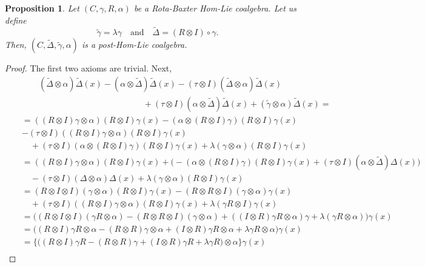 \documentclass{article}
\newtheorem{prop}[thm]{Proposition}
\theoremstyle{definition}
\theoremstyle{remark}
\numberwithin{equation}{section}
\begin{document}
\begin{prop}
 Let $(C, \gamma, R, \alpha)$ be a Rota-Baxter Hom-Lie coalgebra. Let us define
$$\tilde\gamma=\lambda\gamma\quad\mbox{and}\quad\tilde\Delta=(R\otimes I)\circ\gamma.$$
Then, $(C, \tilde\Delta, \tilde\gamma, \alpha)$ is a post-Hom-Lie coalgebra.
\end{prop}
\begin{proof}
The first two axioms are trivial. Next, 
\begin{eqnarray}
&&\qquad(\tilde\Delta\otimes \alpha)\tilde\Delta(x)-(\alpha\otimes \tilde\Delta)\tilde\Delta(x)-(\tau\otimes I)(\tilde\Delta\otimes \alpha)\tilde\Delta(x)\nonumber\\ 
&&\hspace{6cm}+(\tau\otimes I)(\alpha\otimes \tilde\Delta)\tilde\Delta(x)\! +\!(\tilde\gamma\otimes \alpha)\tilde\Delta(x)=\nonumber\\
&&=((R\otimes I)\gamma\otimes \alpha)(R\otimes I)\gamma(x)-(\alpha\otimes(R\otimes I)\gamma)(R\otimes I)\gamma(x)\nonumber\\
&&-(\tau\otimes I)((R\otimes I)\gamma\otimes \alpha)(R\otimes I)\gamma(x)\nonumber\\
&&\quad+(\tau\otimes I)(\alpha\otimes(R\otimes I)\gamma)(R\otimes I)\gamma(x)+\lambda(\gamma\otimes \alpha)(R\otimes I)\gamma(x)\nonumber\\
&&=((R\otimes I)\gamma\otimes \alpha)(R\otimes I)\gamma(x)
+\Big(-(\alpha\otimes(R\otimes I)\gamma)(R\otimes I)\gamma(x)+(\tau\otimes I)(\alpha\otimes \tilde\Delta)\Delta(x)\Big)\nonumber\\
&&\quad -\!(\tau\otimes I)(\Delta\otimes \alpha)\Delta(x)+\lambda(\gamma\otimes \alpha)(R\otimes I)\gamma(x)\nonumber\\
&&=(R\otimes I\otimes I)(\gamma\otimes \alpha)(R\otimes I)\gamma(x)-(R\otimes R\otimes I)(\gamma\otimes \alpha)\gamma(x)\nonumber\\
&&\quad+(\tau\otimes I)((R\otimes I)\gamma\otimes \alpha)(R\otimes I)\gamma(x)+\lambda(\gamma R\otimes I)\gamma(x)\nonumber\\
&&=\Big((R\otimes I\otimes I)(\gamma R\otimes \alpha)-(R\otimes R\otimes I)(\gamma\otimes \alpha)+((I\otimes R)\gamma R\otimes \alpha)\gamma
+\lambda(\gamma R\otimes \alpha)\Big)\gamma(x)\nonumber\\
&&=\Big((R\otimes I)\gamma R\otimes \alpha-(R\otimes R)\gamma\otimes \alpha+(I\otimes R)\gamma R\otimes \alpha+\lambda\gamma R\otimes \alpha\Big)\gamma(x)\nonumber\\
&&=\Big\{\Big((R\otimes I)\gamma R-(R\otimes R)\gamma+(I\otimes R)\gamma R+\lambda\gamma R\Big)\otimes \alpha\Big\}\gamma(x)\nonumber\\

\end{eqnarray}
\end{proof}
\end{document}
